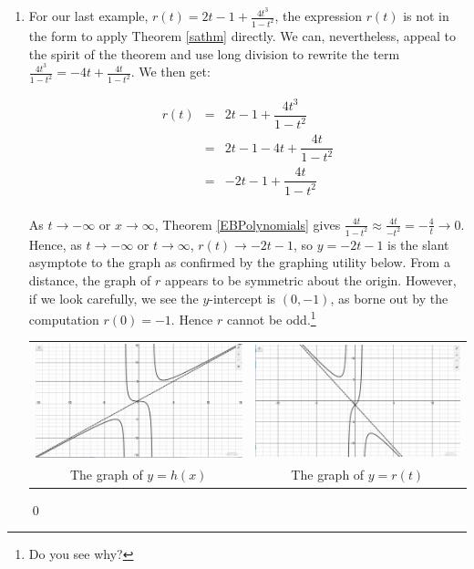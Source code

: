\documentclass{ximera}
\begin{document}
\begin{ex}
\begin{enumerate}
\item  For our last example,  $r(t) = 2t-1+\frac{4t^3}{1-t^2}$, the expression $r(t)$ is not in the form to apply Theorem \ref{sathm} directly.  We can, nevertheless, appeal to the spirit of the theorem and use long division to rewrite the term $\frac{4t^3}{1-t^2} = -4t + \frac{4t}{1-t^2}$.  We then get:

 \[ \begin{array}{rcl}
 
 r(t) & = & 2t-1+\dfrac{4t^3}{1-t^2} \\
       &= &  2t-1-4t+\dfrac{4t}{1-t^2} \\
       & = & -2t-1 + \dfrac{4t}{1-t^2} \\ \end{array}\]
       
As $t \rightarrow -\infty$ or $x \rightarrow \infty$,  Theorem \ref{EBPolynomials} gives  $\frac{4t}{1-t^2} \approx \frac{4t}{-t^2} = -\frac{4}{t} \rightarrow 0$.  Hence, as $t \rightarrow -\infty$ or $t \rightarrow \infty$, $r(t) \rightarrow -2t-1$, so $y = -2t-1$ is the slant asymptote to the graph as confirmed by the graphing utility below.  From a distance, the graph of $r$ appears to be symmetric about the origin.  However, if we look carefully, we see the $y$-intercept is $(0,-1)$, as borne out by the computation $r(0) = -1$.  Hence $r$ cannot be odd.\footnote{Do you see why?}

\begin{center}
\begin{tabular}{cc}

\includegraphics[width=3in]{./IntroRationalGraphics/SAEx04.jpg}  & \includegraphics[width=3in]{./IntroRationalGraphics/SAEx05.jpg} \\
The graph of $y=h(x)$  & The graph of $y=r(t)$ \\


\end{tabular}
\end{center}

\qed

\end{enumerate}

\end{ex}
\end{document}
